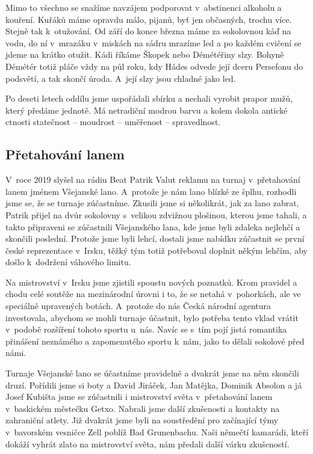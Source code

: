\documentclass[a5paper, 11pt, twoside]{article}
\begin{document}
Mimo to všechno se snažíme navzájem podporovat v~abstinenci alkoholu a
kouření. Kuřáků máme opravdu málo, pijanů, byť jen občasných, trochu
více. Stejně tak k~otužování. Od září do konce března máme za sokolovnou
káď na vodu, do ní v~mrazáku v~miskách na sádru mrazíme led a po každém
cvičení se jdeme na krátko otužit. Kádi říkáme Škopek nebo Démétéřiny
slzy. Bohyně Démétér totiž pláče vždy na půl roku, kdy Hádes odvede její
dceru Persefonu do podsvětí, a tak skončí úroda. A~její slzy jsou
chladné jako led.

Po deseti letech oddílu jsme uspořádali sbírku a nechali vyrobit prapor
mužů, který předáme jednotě. Má netradiční modrou barvu a kolem dokola
antické ctnosti statečnost -- moudrost -- uměřenost -- spravedlnost.

\subsection{Přetahování lanem}

V~roce 2019 slyšel na rádiu Beat Patrik Valut reklamu na turnaj
v~přetahování lanem jménem Všejanské lano. A~protože je nám lano blízké ze
šplhu, rozhodli jsme se, že se turnaje zúčastníme. Zkusili jsme si
několikrát, jak za lano zabrat, Patrik přijel na dvůr sokolovny
s~velikou zdvižnou plošinou, kterou jsme tahali, a takto připraveni se
zúčastnili Všejanského lana, kde jsme byli zdaleka nejlehčí a skončili
poslední. Protože jsme byli lehcí, dostali jsme nabídku zúčastnit se
první české reprezentace v~Irsku, těžký tým totiž potřeboval doplnit
někým lehčím, aby došlo k~dodržení váhového limitu.

Na mistrovství v~Irsku jsme zjistili spoustu nových poznatků. Krom
pravidel a chodu celé soutěže na mezinárodní úrovni i to, že se netahá
v~pohorkách, ale ve speciálně upravených botách. A~protože do nás Česká
národní agentura investovala, abychom se mohli turnaje účastnit, bylo
potřeba tento vklad vrátit v~podobě rozšíření tohoto sportu u~nás. Navíc
se s~tím pojí jistá romantika přinášení neznámého a zapomenutého sportu
k~nám, jako to dělali sokolové před námi.

Turnaje Všejanské lano se účastníme pravidelně a dvakrát jsme na něm
skončili druzí. Pořídili jsme si boty a David Jiráček, Jan Matějka,
Dominik Absolon a já Josef Kubišta jsme se zúčastnili i mistrovství
světa v~přetahování lanem v~baskickém městečku Getxo. Nabrali jsme další
zkušenosti a kontakty na zahraniční atlety. Již dvakrát jsme byli na
soustředění pro začínající týmy v~bavorském vesničce Zell poblíž Bad
Grunenbachu. Naši němečtí kamarádi, kteří dokáží vyhrát zlato na
mistrovství světa, nám předali další várku zkušeností.
\end{document}
